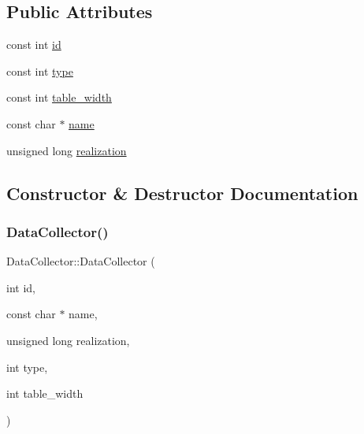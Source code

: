 \subsection*{Public Attributes}
\begin{DoxyCompactItemize}
\item 
const int \mbox{\hyperlink{classDataCollector_a5cb840b6fbcf6afe364eef9114984383}{id}}
\item 
const int \mbox{\hyperlink{classDataCollector_acad1c22d67a8eb3db056ba776a131900}{type}}
\item 
const int \mbox{\hyperlink{classDataCollector_af46c27a47de92d92dcdae6b26a905a44}{table\+\_\+width}}
\item 
const char $\ast$ \mbox{\hyperlink{classDataCollector_a3a9a5033592f72ada429aa20056162b9}{name}}
\item 
unsigned long \mbox{\hyperlink{classDataCollector_a9ef2887466fe3123aa19ef956a219b96}{realization}}
\end{DoxyCompactItemize}


\subsection{Constructor \& Destructor Documentation}
\mbox{\label{classDataCollector_a3f89b18f4ac0557d7374d49531a004c0}} 
\subsubsection{\texorpdfstring{Data\+Collector()}{DataCollector()}}
{\footnotesize\ttfamily Data\+Collector\+::\+Data\+Collector (\begin{DoxyParamCaption}\item[{int}]{id,  }\item[{const char $\ast$}]{name,  }\item[{unsigned long}]{realization,  }\item[{int}]{type,  }\item[{int}]{table\+\_\+width }\end{DoxyParamCaption})\hspace{0.3cm}{\ttfamily [explicit]}}

\mbox{\label{classDataCollector_a9f9ff1817bd0601ba33925c3378ac50e}} 
